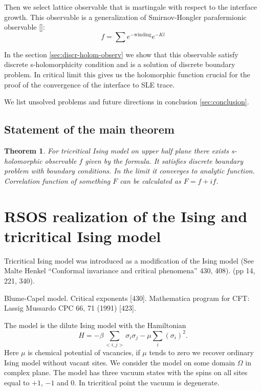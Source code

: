 \documentclass[12pt]{article}
\newtheorem{theorem}{Theorem}
\begin{document}
 Then we
select lattice observable that is martingale with respect to the interface growth.
This observable is a generalization of Smirnov-Hongler parafermionic observable []:
\begin{equation}
  \label{eq:3}
  f = \sum e^{-\mbox{winding}} e^{-Kl}
\end{equation}

In the section \ref{sec:discr-holom-observ} we show that this observable satisfy discrete s-holomorphicity
condition and is a solution of discrete boundary problem. In critical limit this gives us the
holomorphic function crucial for the proof of the convergence of the interface to SLE trace.

We list unsolved problems and future directions in conclusion \ref{sec:conclusion}.

\subsection{Statement of the main theorem}
\label{sec:results}

\begin{theorem}
  For tricritical Ising model on upper half plane there exists s-holomorphic observable $f$ given by the
  formula. It satisfies discrete boundary problem with boundary conditions. In the limit it
  converges to analytic function. Correlation function of something $F$ can be calculated as $F=f+if$.
\end{theorem}
\section{RSOS realization of the Ising and tricritical Ising model}
\label{sec:rsos-real-ising}

Tricritical Ising model was introduced as a modification of the Ising model \cite{} (See Malte Henkel ``Conformal invariance and critical phenomena'' 430, 408). (pp 14, 221, 340).

Blume-Capel model. Critical exponents [430]. Mathematica program for CFT: Lassig Mussardo CPC 66, 71 (1991) [423].

 The model is
the dilute Ising model with the Hamiltonian 
\begin{equation}
  \label{eq:1}
  H = -\beta \sum_{<i,j>}\sigma_i\sigma_j - \mu \sum_{i}(\sigma_i)^2.
\end{equation}
Here $\mu$ is chemical potential of vacancies,
if $\mu$ tends to zero we recover ordinary Ising model without vacant sites. We consider the model on some domain
$\Omega$ in complex plane. The model has three vacuum states with the spins on all sites equal to
$+1$, $-1$ and $0$. In tricritical point the vacuum is degenerate. 
\end{document}
